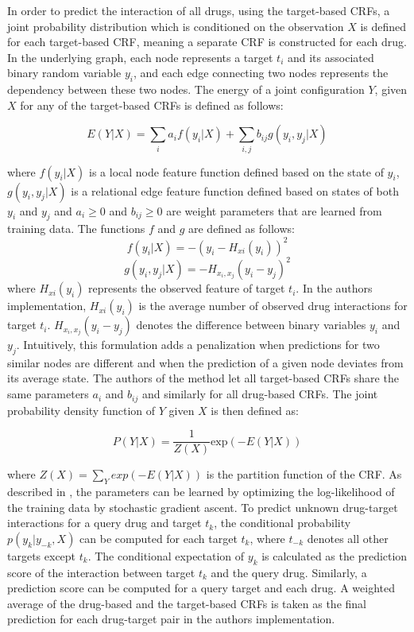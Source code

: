 In order to predict the interaction of all drugs, using the target-based CRFs, a joint probability distribution which is conditioned on the observation $X$ is defined for each target-based CRF, meaning a separate CRF is constructed for each drug. In the underlying graph, each node represents a target $t_i$ and its associated binary random variable $y_i$, and each edge connecting two nodes represents the dependency between these two nodes. The energy of a joint configuration $Y$, given $X$ for any of the target-based CRFs is defined as follows:

\begin{equation}
E(Y|X) = \sum\limits_{i} a_i f(y_i|X) + \sum\limits_{i,j} b_{ij}g(y_i, y_j | X)
\end{equation}

where $f(y_i|X)$ is a local node feature function defined based on the state of $y_i$, $g(y_i, y_j | X)$ is a relational edge feature function defined based on states of both $y_i$ and $y_j$ and $a_i\geq 0$ and $b_{ij} \geq 0$ are weight parameters that are learned from training data. The functions $f$ and $g$ are defined as follows:
\begin{equation}
f(y_i|X) = -(y_i - H_{xi}(y_i))^2
\end{equation}
\begin{equation}
g(y_i,y_j | X) = -H_{x_i,x_j}(y_i-y_j)^2
\end{equation}
where $H_{xi}(y_i)$ represents the observed feature of target $t_i$. In the authors implementation, $H_{xi}(y_i)$ is the average number of observed drug interactions for target $t_i$. $H_{x_i,x_j}(y_i-y_j)$ denotes the difference between binary variables $y_i$ and $y_j$. Intuitively, this formulation adds a penalization when predictions for two similar nodes are different and when the prediction of a given node deviates from its average state.
The authors of the method let all target-based CRFs share the same parameters $a_i$ and $b_{ij}$ and similarly for all drug-based CRFs. The joint probability density function of $Y$ given $X$ is then defined as:

\begin{equation}
P(Y|X) = \frac{1}{Z(X)}\text{exp}(-E(Y|X))
\end{equation}

where $Z(X)=\sum\limits_{Y}exp(-E(Y|X))$ is the partition function of the CRF. As described in \cite{yang2014drug}, the parameters can be learned by optimizing the log-likelihood of the training data by stochastic gradient ascent. To predict unknown drug-target interactions for a query drug and target $t_k$, the conditional probability $p(y_k|y_{-k},X)$ can be computed for each target $t_k$, where $t_{-k}$ denotes all other targets except $t_k$. The conditional expectation of $y_k$ is calculated as the prediction score of the interaction between target $t_k$ and the query drug. Similarly, a prediction score can be computed for a query target and each drug. A weighted average of the drug-based and the target-based CRFs is taken as the final prediction for each drug-target pair in the authors implementation.




